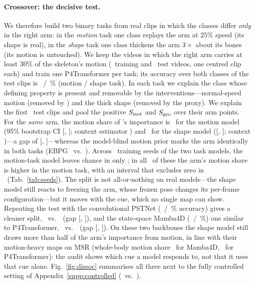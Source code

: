 \paragraph{Crossover: the decisive test.} We therefore build two binary tasks from real clips in which the classes differ \emph{only} in the right arm: in the \emph{motion} task one class replays the arm at $25\%$ speed (its shape is real), in the \emph{shape} task one class thickens the arm $3\times$ about its bones (its motion is untouched). We keep the videos in which the right arm carries at least 30\% of the skeleton's motion (\NumXTrain\ training and \NumXTest\ test videos, one centred clip each) and train one P4Transformer per task; its accuracy over both classes of the test clips is \NumXMotAcc\ / \NumXGeoAcc\,\% (motion / shape task). In each task we explain the class whose defining property is present and removable by the interventions---normal-speed motion (removed by \frz) and the thick shape (removed by the proxy). We explain the first \NumXEval\ test clips and pool the positive $S_{\mathrm{mot}}$ and $S_{\mathrm{geo}}$ over their arm points. For the \emph{same} arm, the motion share of \method's importance is \NumXMotShare\ for the motion model (95\% bootstrap CI [\NumXMotLo, \NumXMotHi]; context estimator \NumXMotShareCtx) and \NumXGeoShare\ for the shape model ([\NumXGeoLo, \NumXGeoHi]; context \NumXGeoShareCtx)---a gap of [\NumXGapLo, \NumXGapHi]---whereas the model-blind motion prior marks the arm identically in both tasks (EBPG \NumXMotPriorEBPG\ vs.\ \NumXGeoPriorEBPG). Across \NumXSeedsTotal\ training seeds of the two task models, the motion-task model leaves chance in only \NumXSeedsTrained; in all \NumXSeedsSameDir\ of these the arm's motion share is higher in the motion task, with an interval that excludes zero in \NumXSeedsCIExcl\ (Tab.~\ref{tab:seeds}). The split is not all-or-nothing on real models---the shape model still reacts to freezing the arm, whose frozen pose changes its per-frame configuration---but it moves with the cue, which no single map can show. Repeating the test with the convolutional PSTNet (\NumXPstMotAcc\ / \NumXPstGeoAcc\,\% accuracy) gives a cleaner split, \NumXPstMotShare\ vs.\ \NumXPstGeoShare\ (gap [\NumXPstGapLo, \NumXPstGapHi]), and the state-space Mamba4D (\NumXMbaMotAcc\ / \NumXMbaGeoAcc\,\%) one similar to P4Transformer, \NumXMbaMotShare\ vs.\ \NumXMbaGeoShare\ (gap [\NumXMbaGapLo, \NumXMbaGapHi]). On these two backbones the shape model still draws more than half of the arm's importance from motion, in line with their motion-heavy maps on MSR (whole-body motion share \NumMBAKcaCtxMotShareAll\ for Mamba4D, \NumPFTKcaCtxMotShareAll\ for P4Transformer): the audit shows which cue a model responds to, not that it uses that cue alone. Fig.~\ref{fig:dissoc} summarises all three next to the fully controlled setting of Appendix~\ref{supp:controlled} (\NumCtrlMot\ vs.\ \NumCtrlShape).

